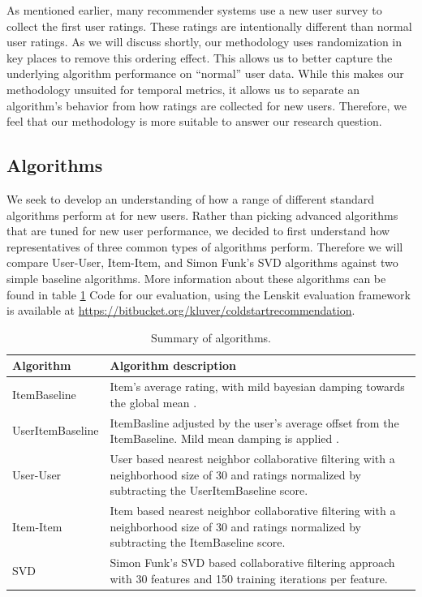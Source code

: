 \documentclass[letterpaper]{sig-alternate}
\begin{document}
  As mentioned earlier, many recommender systems use a new user survey to collect the first user ratings.
  These ratings are intentionally different than normal user ratings.
  As we will discuss shortly, our methodology uses randomization in key places to remove this ordering effect.
  This allows us to better capture the underlying algorithm performance on ``normal'' user data.
  While this makes our methodology unsuited for temporal metrics, it allows us to separate an algorithm's behavior from how ratings are collected for new users.
  Therefore, we feel that our methodology is more suitable to answer our research question.

  \subsection*{Algorithms}

  We seek to develop an understanding of how a range of different standard algorithms perform at for new users.
  Rather than picking advanced algorithms that are tuned for new user performance, we decided to first understand how representatives of three common types of algorithms perform.
  Therefore we will compare User-User, Item-Item, and Simon Funk's SVD algorithms against two simple baseline algorithms.
  More information about these algorithms can be found in table \ref{tbl:algo}
  Code for our evaluation, using the Lenskit evaluation framework \cite{lenskit} is available at \url{https://bitbucket.org/kluver/coldstartrecommendation}.
  
  \begin{table}
    \centering
    \begin{tabular}{|p{6em}|p{18em}|}
      \hline
      Algorithm          & Algorithm description \\\hline
      ItemBaseline       & Item's average rating, with mild bayesian damping towards the global mean \cite{funk_netflix_2006}. \\\hline
      UserItem\-Baseline & ItemBasline adjusted by the user's average offset from the ItemBaseline. Mild mean damping is applied \cite{funk_netflix_2006}. \\\hline
      User-User          & User based nearest neighbor collaborative filtering \cite{resnick1994grouplens} with a neighborhood size of 30 and ratings normalized by subtracting the UserItemBaseline score. \\\hline
      Item-Item          & Item based nearest neighbor collaborative filtering \cite{sarwar2001item} with a neighborhood size of 30 and ratings normalized by subtracting the ItemBaseline score.   \\\hline
      SVD                & Simon Funk's SVD based collaborative filtering approach \cite{funk_netflix_2006} with 30 features and 150 training iterations per feature. \\\hline
    \end{tabular}
    \caption{Summary of algorithms.}
    \label{tbl:algo}
  \end{table}
  
\end{document}
